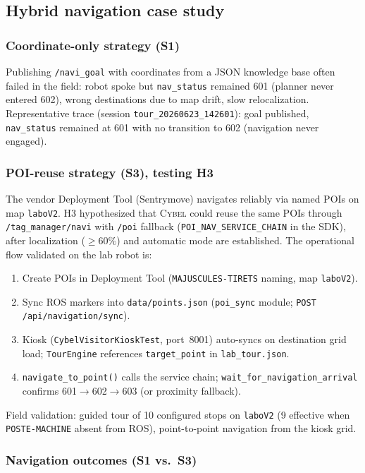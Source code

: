 \documentclass[conference]{IEEEtran}
\newcommand{\cybel}{\textsc{Cybel}}
\begin{document}
\subsection{Hybrid navigation case study}
\label{sec:hybrid}

\subsubsection{Coordinate-only strategy (S1)}
Publishing \texttt{/navi\_goal} with coordinates from a JSON knowledge base often failed in the field: robot spoke but \texttt{nav\_status} remained 601 (planner never entered 602), wrong destinations due to map drift, slow relocalization.
Representative trace (session \texttt{tour\_20260623\_142601}): goal published, \texttt{nav\_status} remained at 601 with no transition to 602 (navigation never engaged).

\subsubsection{POI-reuse strategy (S3), testing H3}
The vendor Deployment Tool (Sentrymove) navigates reliably via named POIs on map \texttt{laboV2}.
H3 hypothesized that \cybel{} could reuse the same POIs through \texttt{/tag\_manager/navi} with \texttt{/poi} fallback (\texttt{POI\_NAV\_SERVICE\_CHAIN} in the SDK), after localization (${\geq}60\%$) and automatic mode are established.
The operational flow validated on the lab robot is:
\begin{enumerate}[leftmargin=1.2em]
\item Create POIs in Deployment Tool (\texttt{MAJUSCULES-TIRETS} naming, map \texttt{laboV2}).
\item Sync ROS markers into \texttt{data/points.json} (\texttt{poi\_sync} module; \texttt{POST /api/navigation/sync}).
\item Kiosk (\texttt{CybelVisitorKioskTest}, port~8001) auto-syncs on destination grid load; \texttt{TourEngine} references \texttt{target\_point} in \texttt{lab\_tour.json}.
\item \texttt{navigate\_to\_point()} calls the service chain; \texttt{wait\_for\_navigation\_arrival} confirms 601$\rightarrow$602$\rightarrow$603 (or proximity fallback).
\end{enumerate}
Field validation: guided tour of 10 configured stops on \texttt{laboV2} (9 effective when \texttt{POSTE-MACHINE} absent from ROS), point-to-point navigation from the kiosk grid.

\subsubsection{Navigation outcomes (S1 vs.\ S3)}
\end{document}
